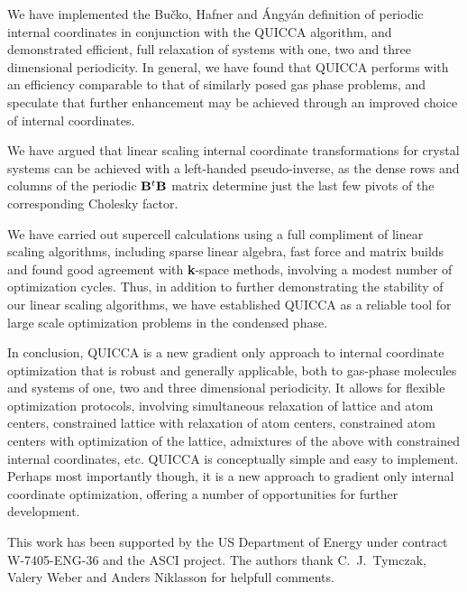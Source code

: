 \twolinestyle{\documentclass[prb,preprint]{revtex4}}
\begin{document}
We have implemented the Bu\v{c}ko, Hafner and {\'A}ngy{\'a}n  \cite{TBucko05}
definition of periodic internal coordinates in conjunction with the QUICCA
algorithm, and demonstrated efficient, full relaxation of systems with 
one, two and three dimensional periodicity.  In general, we have found that
QUICCA performs with an efficiency comparable to that of similarly posed gas 
phase problems, and speculate that further enhancement  may be achieved through
an improved choice of internal coordinates.

We have argued that linear scaling internal coordinate transformations for 
crystal systems can be achieved with a left-handed pseudo-inverse, as the 
dense rows and columns of the periodic ${\bf B}^t {\bf B}$ matrix determine
just the last few pivots of the corresponding Cholesky factor.

We have carried out supercell calculations using a full compliment of
linear scaling algorithms, including sparse linear algebra, fast force and 
matrix builds and found good agreement with {\bf k}-space methods, involving 
a modest number of optimization cycles.  Thus, in addition to further demonstrating 
the stability of our linear scaling algorithms, we have established QUICCA as a 
reliable tool for large scale optimization problems in the condensed phase.

In conclusion, QUICCA is a new gradient only approach to internal coordinate
optimization that is robust and generally applicable, both to gas-phase
molecules and systems of one, two and three dimensional periodicity.  It 
allows for flexible optimization protocols, involving simultaneous 
relaxation of lattice and atom centers, constrained lattice with relaxation of 
atom centers, constrained atom centers with optimization of the lattice,
admixtures of the above with constrained internal coordinates, etc. 
QUICCA is conceptually simple and easy to implement.
Perhaps most importantly though, it is a new approach to gradient only 
internal coordinate optimization, offering a number of opportunities for 
further development.

\begin{acknowledgments}
 This work has been supported by the US Department of Energy 
 under contract W-7405-ENG-36 and the ASCI project.  The authors
 thank C.~J.~Tymczak, Valery Weber and Anders Niklasson for helpfull 
 comments.
\end{acknowledgments}

%

\end{document}
